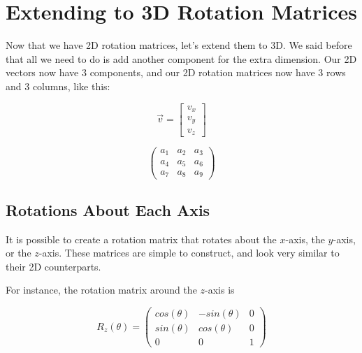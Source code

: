 \documentclass[11pt]{article}
\begin{document}
\section{Extending to 3D Rotation Matrices}
\label{sec:3d-rotation}

Now that we have 2D rotation matrices, let’s extend them to 3D.  We said before that all we need
to do is add another component for the extra dimension.  Our 2D vectors now have 3 components,
and our 2D rotation matrices now have 3 rows and 3 columns, like this:

\begin{equation}
    \vec{v} = \begin{bmatrix} 
        v_x \\ 
        v_y \\
        v_z
    \end{bmatrix}
\end{equation}

\begin{equation}
    \begin{pmatrix}
        a_1 & a_2 & a_3 \\
        a_4 & a_5 & a_6 \\
        a_7 & a_8 & a_9
    \end{pmatrix}
\end{equation}

\subsection{Rotations About Each Axis}

It is possible to create a rotation matrix that rotates about the \(x\)-axis, the \(y\)-axis,
or the \(z\)-axis.  These matrices are simple to construct, and look very similar to their 2D
counterparts.

For instance, the rotation matrix around the \(z\)-axis is

\begin{equation}
    R_z(\theta) = 
    \begin{pmatrix}
        cos(\theta) & -sin(\theta) & 0 \\
        sin(\theta) & cos(\theta) & 0 \\
        0 & 0 & 1
    \end{pmatrix}
\end{equation}
\end{document}

